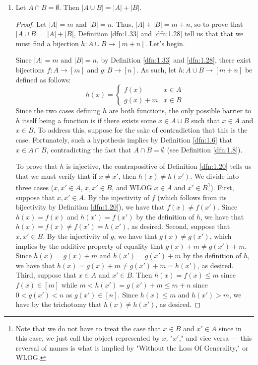 \documentclass[../main.tex]{subfiles}
\begin{document}
\begin{exercise}
\begin{enumerate}[label={\alph*)},ref={\thetheorem\alph*}]
\begin{proof}
        \end{proof}
        \item \label{exr:1.34b}Let $A\cap B=\emptyset$. Then $|A\cup B|=|A|+|B|$.
        \begin{proof}
            Let $|A|=m$ and $|B|=n$. Thus, $|A|+|B|=m+n$, so to prove that $|A\cup B|=|A|+|B|$, Definition \ref{dfn:1.33} and \ref{dfn:1.28} tell us that that we must find a bijection $h:A\cup B\to[m+n]$. Let's begin.\par
            Since $|A|=m$ and $|B|=n$, by Definition \ref{dfn:1.33} and \ref{dfn:1.28}, there exist bijections $f:A\to[m]$ and $g:B\to[n]$. As such, let $h:A\cup B\to[m+n]$ be defined as follows:
            \begin{equation*}
                h(x) =
                \begin{cases}
                    f(x) & x\in A\\
                    g(x)+m & x\in B
                \end{cases}
            \end{equation*}
            Since the two cases defining $h$ are both functions, the only possible barrier to $h$ itself being a function is if there exists some $x\in A\cup B$ such that $x\in A$ and $x\in B$. To address this, suppose for the sake of contradiction that this is the case. Fortunately, such a hypothesis implies by Definition \ref{dfn:1.6} that $x\in A\cap B$, contradicting the fact that $A\cap B=\emptyset$ (see Definition \ref{dfn:1.8}).\par
            To prove that $h$ is injective, the contrapositive of Definition \ref{dfn:1.20} tells us that we must verify that if $x\neq x'$, then $h(x)\neq h(x')$. We divide into three cases ($x,x'\in A$, $x,x'\in B$, and WLOG $x\in A$ and $x'\in B$\footnote{Note that we do not have to treat the case that $x\in B$ and $x'\in A$ since in this case, we just call the object represented by $x$, "$x'$," and vice versa --- this reversal of names is what is implied by "Without the Loss Of Generality," or WLOG.}). First, suppose that $x,x'\in A$. By the injectivity of $f$ (which follows from its bijectivity by Definition \ref{dfn:1.20}), we have that $f(x)\neq f(x')$. Since $h(x)=f(x)$ and $h(x')=f(x')$ by the definition of $h$, we have that $h(x)=f(x)\neq f(x')=h(x')$, as desired. Second, suppose that $x,x'\in B$. By the injectivity of $g$, we have that $g(x)\neq g(x')$, which implies by the additive property of equality that $g(x)+m\neq g(x')+m$. Since $h(x)=g(x)+m$ and $h(x')=g(x')+m$ by the definition of $h$, we have that $h(x)=g(x)+m\neq g(x')+m=h(x')$, as desired. Third, suppose that $x\in A$ and $x'\in B$. Then $h(x)=f(x)\leq m$ since $f(x)\in[m]$ while $m<h(x')=g(x')+m\leq m+n$ since $0<g(x')<n$ as $g(x')\in[n]$. Since $h(x)\leq m$ and $h(x')>m$, we have by the trichotomy that $h(x)\neq h(x')$, as desired.\par

\end{proof}
\end{enumerate}
\end{exercise}
\end{document}
